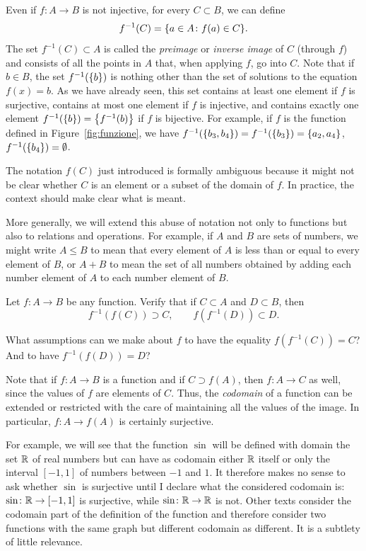 Even if $f\colon A \to B$ is not injective, for every $C\subset B$, we can
define
\[
  f^{-1}(C) = {\left\{ a\in A\colon f(a) \in C \right\}}.
\]
The set $f^{-1}(C)\subset A$ is called the \emph{preimage} or \emph{inverse
image}      of $C$ (through $f$) and consists of all
the points in $A$ that, when applying $f$, go into $C$. Note that if $b\in B$,
the set $f^{-1}({\left\{ b \right\}})$ is nothing other than the set of solutions to the
equation $f(x)=b$. As we have already seen, this set contains at least one
element if $f$ is surjective, contains at most one element if $f$ is injective,
and contains exactly one element $f^{-1}({\left\{ b \right\}}) = {\left\{ f^{-1}(b) \right\}}$ if
$f$ is bijective. For example, if $f$ is the function defined in
Figure~\ref{fig:funzione}, we have $f^{-1}({\left\{ b_3,b_4 \right\}}) =
f^{-1}({\left\{ b_3 \right\}}) = {\left\{ a_2,a_4 \right\}}$, $f^{-1}({\left\{ b_4 \right\}}) = \emptyset$.

The notation $f(C)$ just introduced is formally ambiguous because it might not
be clear whether $C$ is an element or a subset of the domain of $f$. In
practice, the context should make clear what is meant.

More generally, we will extend this abuse of notation not only to functions but
also to relations and operations. For example, if $A$ and $B$ are sets of
numbers, we might write $A\le B$ to mean that every element of $A$ is less than
or equal to every element of $B$, or $A+B$ to mean the set of all numbers
obtained by adding each number element of $A$ to each number element of $B$.

\begin{exercise}
    Let $f\colon A \to B$ be any function. Verify that if $C\subset A$ and
  $D\subset B$, then
  \[
    f^{-1}(f(C))\supset C,
    \qquad 
    f(f^{-1}(D)) \subset D. 
  \]
  
    What assumptions can we make about $f$ to have the equality $f(f^{-1}(C)) =
  C$? And to have $f^{-1}(f(D)) = D$?
\end{exercise}

Note that if $f\colon A \to B$ is a function and if $C\supset f(A)$, then
$f\colon A \to C$ as well, since the values of $f$ are elements of $C$. Thus,
the \emph{codomain} of a function can be extended or restricted with the care of
maintaining all the values of the image. In particular, $f\colon A \to f(A)$ is
certainly surjective.

For example, we will see that the function $\sin$ will be defined with domain
the set ${\mathbb R}$ of real numbers but can have as codomain either ${\mathbb R}$ itself or
only the interval $[-1,1]$ of numbers between $-1$ and $1$. It therefore makes
no sense to ask whether $\sin$ is surjective until I declare what the considered
codomain is: $\sin\colon {\mathbb R}\to[-1,1]$ is surjective, while $\sin\colon
{\mathbb R}\to{\mathbb R}$ is not. Other texts consider the codomain part of the definition of
the function and therefore consider two functions with the same graph but
different codomain as different. It is a subtlety of little relevance.

